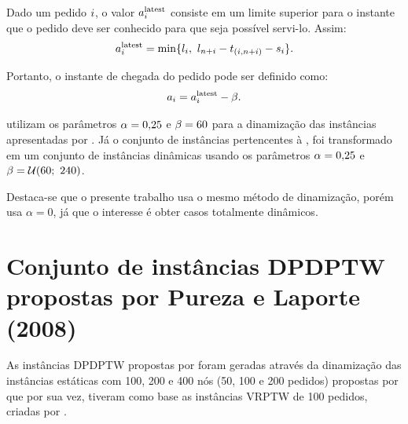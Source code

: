 Dado um pedido $i$, o valor $a{}_{i{}}^{\mathrm{latest}}$  consiste em um
limite superior para o instante que o pedido deve ser conhecido para que seja
possível servi-lo. Assim:
%
\begin{equation}
    a{}_{i{}}^{\mathrm{latest}} = 
    \min\{l_{i},
    \ l_{n + i}  
    - t_{(i,n + i)} 
    - s_{i}\}.
    \label{eq:berbeglia_hybrid_2012_requestLatestArrivalTime}
\end{equation}

\noindent Portanto, o instante de chegada do pedido pode ser definido como:
%
\begin{equation}
    a_{i} = a{}_{i{}}^{\mathrm{latest}} - \beta.
    \label{eq:berbeglia_hybrid_2012_requestArrivalTime}
\end{equation}


\noindent \textcite{berbeglia_hybrid_tabu_2012} utilizam os parâmetros 
$\alpha = 0{,}25$ e $\beta = 60$ para a dinamização das 
instâncias apresentadas por \textcite{ropke_models_2007}.
Já o conjunto de instâncias pertencentes à \textcite{cordeau_tabu_2003}, foi 
transformado em um conjunto de instâncias dinâmicas usando os parâmetros 
$\alpha = 0{,}25$ e $\beta =\mathcal{U}(60;\ 240)$.

Destaca-se que o presente trabalho usa o mesmo método de dinamização, porém usa 
$\alpha = 0$, já que o interesse é obter casos totalmente dinâmicos.




\section{Conjunto de instâncias DPDPTW propostas por 
Pureza e Laporte (2008)}
\label{sec:pureza_instances}

As instâncias DPDPTW propostas por \textcite{pureza_laporte_waiting_2008} 
foram geradas através da dinamização das instâncias estáticas com 100, 200 e 
400 nós (50, 100 e 200 pedidos) propostas por 
\textcite{li_metaheuristic_2003} que por sua vez, tiveram como base as 
instâncias VRPTW de 100 pedidos, criadas por 
\textcite{solomon_algorithms_1987}.

